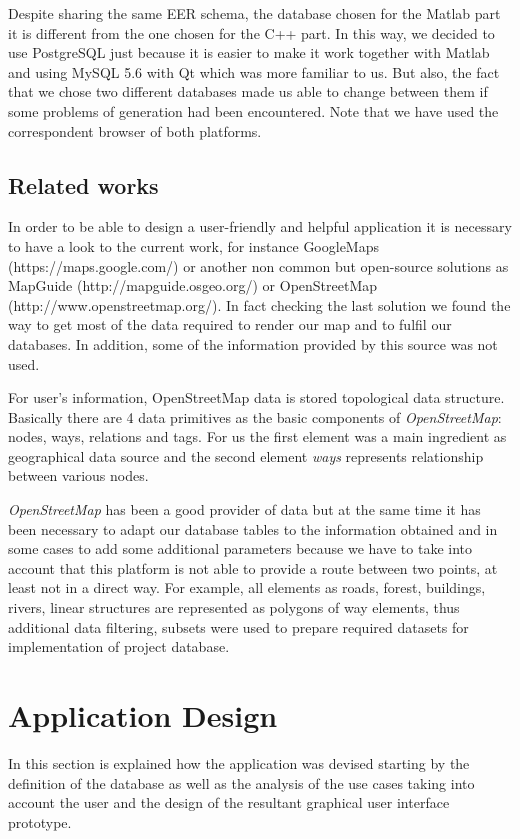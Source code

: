 \documentclass{article}
\begin{document}
Despite sharing the same EER schema, the database chosen for the Matlab part it is different from the one chosen for the C++ part. In this way, we decided to use PostgreSQL just because it is easier to make it work together with Matlab and using MySQL 5.6 with Qt which was more familiar to us. But also, the fact that we chose two different databases made us able to change between them if some problems of generation had been encountered. Note that we have used the correspondent browser of both platforms.

\subsection{Related works}

In order to be able to design a user-friendly and helpful application it is necessary to have a look to the current work, for instance GoogleMaps (https://maps.google.com/) or another non common but open-source solutions as MapGuide (http://mapguide.osgeo.org/) or OpenStreetMap (http://www.openstreetmap.org/). In fact checking the last solution we found the way to get most of the data required to render our map and to fulfil our databases. In addition, some of the information provided by this source was not used.

For user's information, OpenStreetMap data is stored topological data structure. Basically there are 4 data primitives as the basic components of \textit{OpenStreetMap}: nodes, ways, relations and tags. For us the first element was a main ingredient as geographical data source and the second element \textit{ways} represents relationship between various nodes. 

\textit{OpenStreetMap} has been a good provider of data but at the same time it has been necessary to adapt our database tables to the information obtained and in some cases to add some additional parameters because we have to take into account that this platform is not able to provide a route between two points, at least not in a direct way. For example, all elements as roads, forest, buildings, rivers, linear structures are represented as polygons of way elements, thus additional data filtering, subsets were used to prepare required datasets for implementation of project database.



\section{Application Design}
In this section is explained how the application was devised starting by the definition of the database as well as the analysis of the use cases taking into account the user and the design of the resultant graphical user interface prototype.
\end{document}
